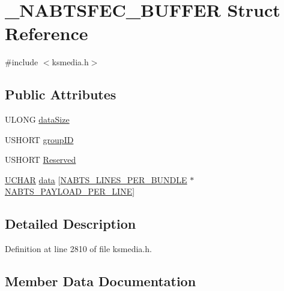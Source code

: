 \hypertarget{struct___n_a_b_t_s_f_e_c___b_u_f_f_e_r}{}\section{\+\_\+\+N\+A\+B\+T\+S\+F\+E\+C\+\_\+\+B\+U\+F\+F\+ER Struct Reference}
\label{struct___n_a_b_t_s_f_e_c___b_u_f_f_e_r}


{\ttfamily \#include $<$ksmedia.\+h$>$}

\subsection*{Public Attributes}
\begin{DoxyCompactItemize}
\item 
U\+L\+O\+NG \hyperlink{struct___n_a_b_t_s_f_e_c___b_u_f_f_e_r_ac4851240a3de014fc6d4550d96f9c15c}{data\+Size}
\item 
U\+S\+H\+O\+RT \hyperlink{struct___n_a_b_t_s_f_e_c___b_u_f_f_e_r_ae64a72cf73b24b1139d0c4c8ed830827}{group\+ID}
\item 
U\+S\+H\+O\+RT \hyperlink{struct___n_a_b_t_s_f_e_c___b_u_f_f_e_r_ab86bb027cabb01948a272585253e46f2}{Reserved}
\item 
\hyperlink{xlisp_8h_a9a1dc6d243c6f75bb42f87e3f69649e4}{U\+C\+H\+AR} \hyperlink{struct___n_a_b_t_s_f_e_c___b_u_f_f_e_r_ad8376043aa7387d9ab4d7795764afa52}{data} \mbox{[}\hyperlink{ksmedia_8h_a5987063fb173bfd92802ed9eca253b13}{N\+A\+B\+T\+S\+\_\+\+L\+I\+N\+E\+S\+\_\+\+P\+E\+R\+\_\+\+B\+U\+N\+D\+LE} $\ast$\hyperlink{ksmedia_8h_aee49e19f4678408957e8b0fed203f74f}{N\+A\+B\+T\+S\+\_\+\+P\+A\+Y\+L\+O\+A\+D\+\_\+\+P\+E\+R\+\_\+\+L\+I\+NE}\mbox{]}
\end{DoxyCompactItemize}


\subsection{Detailed Description}


Definition at line 2810 of file ksmedia.\+h.



\subsection{Member Data Documentation}
